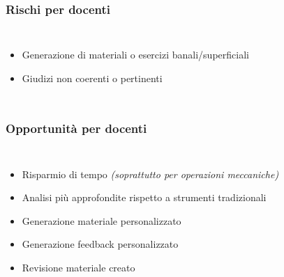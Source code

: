 


\begin{contentframe}
    \frametitle{Rischi per docenti}

    \begin{columns}
        \begin{itemize}
            \item Generazione di materiali o esercizi banali/superficiali
            \item Giudizi non coerenti o pertinenti
        \end{itemize}
    
        \centering
    \end{columns}
\end{contentframe}

\begin{contentframe}
    \frametitle{Opportunità per docenti}

    \begin{columns}
        \begin{itemize}
            \item Risparmio di tempo \textit{(soprattutto per operazioni meccaniche)}
            \item Analisi più approfondite rispetto a strumenti tradizionali
            \item Generazione materiale personalizzato
            \item Generazione feedback personalizzato
            \item Revisione materiale creato
        \end{itemize}
        
        \centering
    \end{columns}
\end{contentframe}

